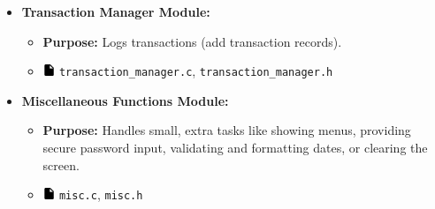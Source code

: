 \documentclass[12pt,a4paper]{report}
\begin{document}
\begin{itemize}
\begin{itemize}
    \end{itemize}
    \item \normalsize \textbf{Transaction Manager Module:}
    \begin{itemize}
        \item \normalsize \textbf{Purpose:} Logs transactions (add transaction records).
        \item \includegraphics[width=0.03\textwidth]{../resources/assets/images/file_icon.png} \texttt{transaction\_manager.c}, \texttt{transaction\_manager.h}
    \end{itemize}
    \item \normalsize \textbf{Miscellaneous Functions Module:}
    \begin{itemize}
        \item \normalsize \textbf{Purpose:} Handles small, extra tasks like showing menus, providing secure password input, validating and formatting dates, or clearing the screen.
        \item \includegraphics[width=0.03\textwidth]{../resources/assets/images/file_icon.png} \texttt{misc.c}, \texttt{misc.h}
    \end{itemize}
\end{itemize}
\end{document}
